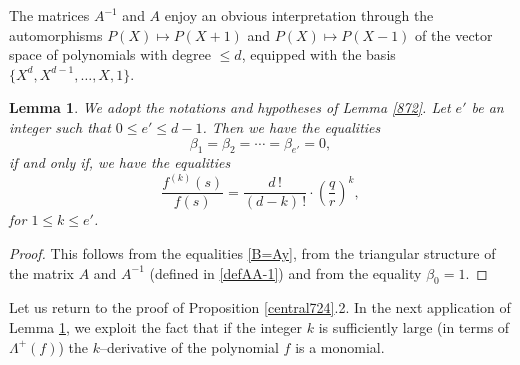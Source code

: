 \documentclass[10pt]{article}
\newtheorem{lemma}[theorem]{Lemma}
\theoremstyle{definition}
\numberwithin{equation}{section}
\begin{document}
The matrices $A^{-1}$ and $A$ enjoy an obvious interpretation through the automorphisms $P(X)\mapsto P(X+1)$ and $P(X)\mapsto P(X-1)$ of the vector space of polynomials with degree $\leqslant d$, equipped with the basis $\{X^d,X^{d-1},\dots,X,1\}$. 
 
\begin{lemma}\label{356bis} We adopt the notations and hypotheses of Lemma \ref{872}. Let $e'$ be an integer such that $0 \leqslant e'\leqslant d-1$. Then we have the equalities
\[
\beta_1= \beta_2 = \cdots = \beta_{e' }=0,
\]
if and only if, we have the equalities
\begin{equation}\label{361bis}
\frac{f^{(k)} (s)}{f(s)} = \frac{d\, !}{(d-k)\, !}\cdot \left( \frac qr\right)^k, \end{equation}
for $1\leqslant k\leqslant e'$.
\end{lemma}
\begin{proof}
This follows from the equalities \eqref{B=Ay}, from the triangular structure of the matrix $A$ and $A^{-1}$
(defined in \eqref{defAA-1}) and from the equality $\beta_0=1$.
\end{proof}

Let us return to the proof of Proposition \ref{central724}.2. 
In the next application of Lemma \ref{356bis}, we exploit the fact that if the integer $k$ is sufficiently large (in terms of $\Lambda^+ (f)$) the $k$--derivative of the polynomial $f$ is a monomial. 
\end{document}
